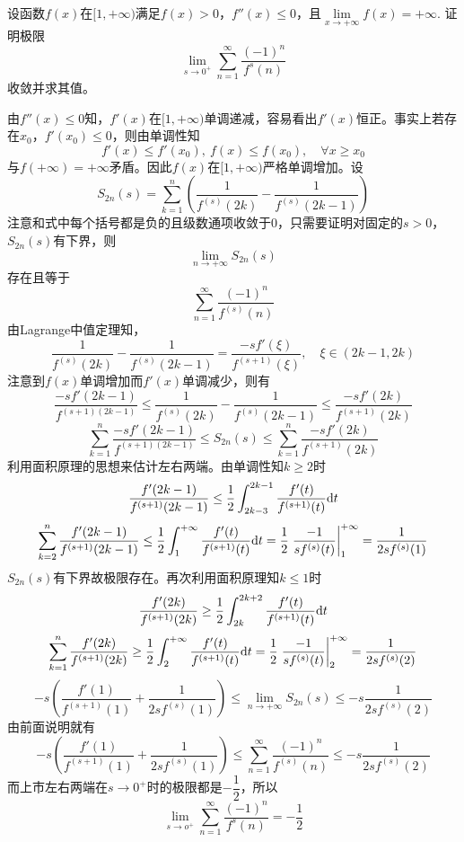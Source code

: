 \begin{proposition}
    
    设函数$f(x)$在$[1, + \infty)$满足$f(x) > 0$，$f''(x) \leq 0$，且$\lim\limits_{x \to +\infty}{f(x)} = +\infty$. 证明极限
    \[\lim\limits_{s \to 0^{+}}{\sum\limits_{n = 1}^{\infty}{\dfrac{(-1)^n}{f^{s}(n)}}}\]
    收敛并求其值。

\end{proposition}

\begin{proposition}

    由$f''(x) \leq 0$知，$f'(x)$在$[1, +\infty)$单调递减，容易看出$f'(x)$恒正。事实上若存在$x_0$，$f'(x_0) \leq 0$，则由单调性知
    \[f'(x) \leq f'(x_0), \ f(x) \leq f(x_0), \quad \forall x \geq x_0\]
    与$f(+\infty) = + \infty$矛盾。因此$f(x)$在$[1, +\infty)$严格单调增加。设
    \[S_{2n}(s) = \sum\limits_{k = 1}^{n}{\left( \dfrac{1}{f^{(s)}(2k)} - \dfrac{1}{f^{(s)}(2k - 1)} \right)}\]
    注意和式中每个括号都是负的且级数通项收敛于$0$，只需要证明对固定的$s > 0$，$S_{2n}(s)$有下界，则
    \[\lim\limits_{n \to +\infty}{S_{2n}(s)}\]
    存在且等于
    \[\sum\limits_{n = 1}^{\infty}{\dfrac{(-1)^n}{f^{(s)}(n)}}\]
    由\textup{Lagrange}中值定理知，
    \[\dfrac{1}{f^{(s)}(2k)} - \dfrac{1}{f^{(s)}(2k - 1)} = \dfrac{-sf'(\xi)}{f^{(s + 1)}(\xi)}, \quad \xi \in (2k - 1, 2k)\]
    注意到$f(x)$单调增加而$f'(x)$单调减少，则有
    \[\dfrac{-sf'(2k - 1)}{f^{(s + 1)(2k - 1)}} \leq \dfrac{1}{f^{(s)}(2k)} - \dfrac{1}{f^{(s)}(2k - 1)} \leq \dfrac{-sf'(2k)}{f^{(s + 1)}(2k)}\]
    \[\sum\limits_{k = 1}^{n}{\dfrac{-sf'(2k - 1)}{f^{(s + 1)(2k - 1)}}} \leq S_{2n}(s) \leq \sum\limits_{k = 1}^{n}{\dfrac{-sf'(2k)}{f^{(s + 1)}(2k)}}\]
    利用面积原理的思想来估计左右两端。由单调性知$k \geq 2$时
    \[\dfrac{f'(2k - 1)}{f^{(s + 1)}(2k - 1)} \leq \dfrac{1}{2} \int_{2k - 3}^{2k - 1}{\dfrac{f'(t)}{f^{(s + 1)}(t)}}\mathrm{d} t\]
    \[\sum\limits_{k = 2}^{n}{\dfrac{f'(2k - 1)}{f^{(s + 1)}(2k - 1)}} \leq \dfrac{1}{2} \int_{1}^{+\infty}{\dfrac{f'(t)}{f^{(s + 1)}(t)}}\mathrm{d} t = \dfrac{1}{2} \left. \dfrac{-1}{sf^{(s)}(t)} \right|_{1}^{+\infty} = \dfrac{1}{2sf^{(s)}(1)}\]
    $S_{2n}(s)$有下界故极限存在。再次利用面积原理知$k \leq 1$时
    \[\dfrac{f'(2k)}{f^{(s + 1)}(2k)} \geq \dfrac{1}{2} \int_{2k}^{2k + 2}{\dfrac{f'(t)}{f^{(s + 1)}(t)}}\mathrm{d} t\]
    \[\sum\limits_{k = 1}^{n}{\dfrac{f'(2k)}{f^{(s + 1)}(2k)}} \geq \dfrac{1}{2} \int_{2}^{+\infty}{\dfrac{f'(t)}{f^{(s + 1)}(t)}}\mathrm{d} t = \dfrac{1}{2} \left. \dfrac{-1}{sf^{(s)}(t)} \right|_{2}^{+\infty} = \dfrac{1}{2sf^{(s)}(2)}\]
    \[-s\left( \dfrac{f'(1)}{f^{(s + 1)}(1)} + \dfrac{1}{2sf^{(s)}(1)} \right) \leq \lim\limits_{n \to +\infty}{S_{2n}(s)} \leq -s\dfrac{1}{2sf^{(s)}(2)}\]
    由前面说明就有
    \[-s\left( \dfrac{f'(1)}{f^{(s + 1)}(1)} + \dfrac{1}{2sf^{(s)}(1)} \right) \leq \sum\limits_{n = 1}^{\infty}{\dfrac{(-1)^n}{f^{(s)}(n)}} \leq -s\dfrac{1}{2sf^{(s)}(2)}\]
    而上市左右两端在$s \to 0^{+}$时的极限都是$-\dfrac{1}{2}$，所以
    \[\lim\limits_{s \to o^{+}}{\sum\limits_{n = 1}^{\infty}{\dfrac{(-1)^n}{f^{s}(n)}}} = -\dfrac{1}{2}\]

\end{proposition}

